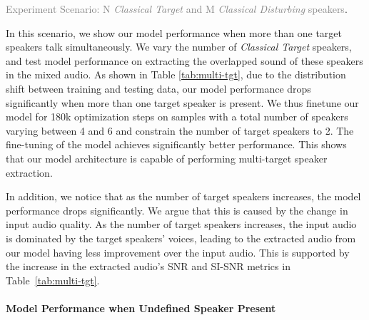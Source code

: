 \textcolor{gray}{Experiment Scenario: N \textit{Classical Target} and M \textit{Classical Disturbing} speakers}.

In this scenario, we show our model performance when more than one target speakers talk simultaneously. We vary the number of \textit{Classical Target} speakers, and test model performance on extracting the overlapped sound of these speakers in the mixed audio. As shown in Table \ref{tab:multi-tgt}, due to the distribution shift between training and testing data, our model performance drops significantly when more than one target speaker is present. We thus finetune our model for 180k optimization steps on samples with a total number of speakers varying between 4 and 6 and constrain the number of target speakers to 2. The fine-tuning of the model achieves significantly better performance. This shows that our model architecture is capable of performing multi-target speaker extraction. 

In addition, we notice that as the number of target speakers increases, the model performance drops significantly. We argue that this is caused by the change in input audio quality. As the number of target speakers increases, the input audio is dominated by the target speakers' voices, leading to the extracted audio from our model having less improvement over the input audio. This is supported by the increase in the extracted audio's SNR and SI-SNR metrics in Table~\ref{tab:multi-tgt}. 



\paragraph{Model Performance when Undefined Speaker Present}


